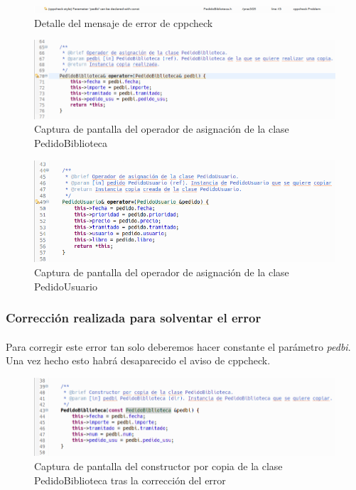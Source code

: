 		\begin{figure}[H]
			\centering
			\includegraphics[scale=0.38]{img/captura55.png}
			\caption{Detalle del mensaje de error de cppcheck}
			\label{captura55}
		\end{figure}
	
		\begin{figure}[H]
			\centering
			\includegraphics[scale=0.5]{img/captura57.png}
			\caption{Captura de pantalla del operador de asignación de la clase PedidoBiblioteca}
			\label{captura57}
		\end{figure}
	
		\begin{figure}[H]
			\centering
			\includegraphics[scale=0.55]{img/captura58.png}
			\caption{Captura de pantalla del operador de asignación de la clase PedidoUsuario}
			\label{captura58}
		\end{figure}
	
		\subsubsection{Corrección realizada para solventar el error}
		
		\paragraph{}Para corregir este error tan solo deberemos hacer constante el parámetro \textit{pedbi}. Una vez hecho esto habrá desaparecido el aviso de cppcheck.
		
		\begin{figure}[H]
			\centering
			\includegraphics[scale=0.55]{img/captura56.png}
			\caption{Captura de pantalla del constructor por copia de la clase PedidoBiblioteca tras la corrección del error}
			\label{captura56}
		\end{figure}
	
